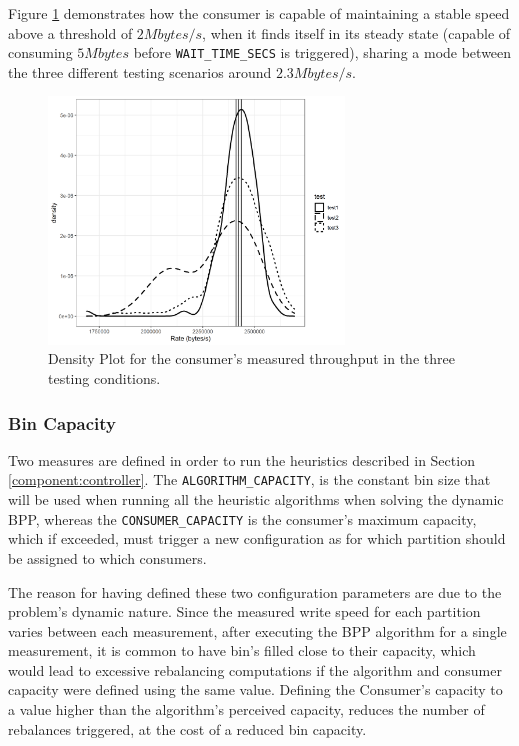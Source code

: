 Figure \ref{fig:consumer_capacity} demonstrates how the consumer is capable of
maintaining a stable speed above a threshold of $2 Mbytes/s$, when it finds
itself in its steady state (capable of consuming $5 Mbytes$ before
\lstinline[language=Python]{WAIT_TIME_SECS} is triggered), sharing a mode
between the three different testing scenarios around $2.3 Mbytes/s$.

\begin{figure}[htb!] \centering
\includegraphics[width=0.7\textwidth]{images/consumer/density.png}
\caption{
    Density Plot for the consumer's measured throughput in the three testing
    conditions.
} 
\label{fig:consumer_capacity} 
\end{figure}

\subsubsection{Bin Capacity} \label{result:bin capacity}

\begin{sloppypar}
Two measures are defined in order to run the heuristics described in Section
\ref{component:controller}. The \lstinline{ALGORITHM_CAPACITY},
is the constant bin size that will be used when running all the heuristic
algorithms when solving the dynamic BPP, whereas the
\lstinline{CONSUMER_CAPACITY} is the consumer's maximum
capacity, which if exceeded, must trigger a new configuration as for which
partition should be assigned to which consumers.
\end{sloppypar}

The reason for having defined these two configuration parameters are due to the
problem's dynamic nature. Since the measured write speed for each partition
varies between each measurement, after executing the BPP algorithm for a single
measurement, it is common to have bin's filled close to their capacity, which
would lead to excessive rebalancing computations if the algorithm and consumer
capacity were defined using the same value. Defining the Consumer's capacity to
a value higher than the algorithm's perceived capacity, reduces the number of
rebalances triggered, at the cost of a reduced bin capacity. 

